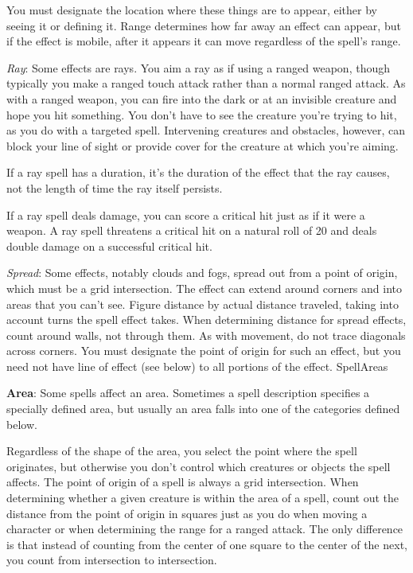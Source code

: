 You must designate the location where these things are to appear, either by seeing it or defining it. Range determines how far away an effect can appear, but if the effect is mobile, after it appears it can move regardless of the spell's range.
				
\textit{Ray}: Some effects are rays. You aim a ray as if using a ranged weapon, though typically you make a ranged touch attack rather than a normal ranged attack. As with a ranged weapon, you can fire into the dark or at an invisible creature and hope you hit something. You don't have to see the creature you're trying to hit, as you do with a targeted spell. Intervening creatures and obstacles, however, can block your line of sight or provide cover for the creature at which you're aiming.
				
If a ray spell has a duration, it's the duration of the effect that the ray causes, not the length of time the ray itself persists.
				
If a ray spell deals damage, you can score a critical hit just as if it were a weapon. A ray spell threatens a critical hit on a natural roll of 20 and deals double damage on a successful critical hit.
				
\textit{Spread}: Some effects, notably clouds and fogs, spread out from a point of origin, which must be a grid intersection. The effect can extend around corners and into areas that you can't see. Figure distance by actual distance traveled, taking into account turns the spell effect takes. When determining distance for spread effects, count around walls, not through them. As with movement, do not trace diagonals across corners. You must designate the point of origin for such an effect, but you need not have line of effect (see below) to all portions of the effect.
SpellAreas

				
\textbf{Area}: Some spells affect an area. Sometimes a spell description specifies a specially defined area, but usually an area falls into one of the categories defined below.
				
Regardless of the shape of the area, you select the point where the spell originates, but otherwise you don't control which creatures or objects the spell affects. The point of origin of a spell is always a grid intersection. When determining whether a given creature is within the area of a spell, count out the distance from the point of origin in squares just as you do when moving a character or when determining the range for a ranged attack. The only difference is that instead of counting from the center of one square to the center of the next, you count from intersection to intersection.
				
